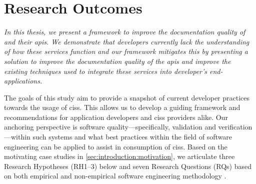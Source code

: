 \section{Research Outcomes}
\label{sec:introduction:hypohtesis}

\begin{framed}
\itshape
\noindent
In this thesis, we present a framework to improve the documentation quality of  and their \glspl{api}. We demonstrate that developers currently lack the understanding of how these services function and our framework mitigates this by presenting a solution to improve the documentation quality of the \glspl{api} and improve the existing techniques used to integrate these services into developer's end-applications.
\end{framed}

\upshape
\bigskip

The goals of this study aim to provide a snapshot of current developer practices towards the usage of \glspl{cis}. This allows us to develop a guiding framework and recommendations for application developers and \glspl{cis} providers alike. Our anchoring perspective is software quality---specifically, validation and verification---within such systems and what best practices within the field of software engineering can be applied to assist in consumption of \glspl{cis}.
 Based on the motivating case studies in \cref{sec:introduction:motivation}, we articulate three Research Hypotheses (RH1--3) below and seven Research Questions (RQs) based on  both empirical and non-empirical software engineering methodology \citep{Shull:2007vh,Simon:1996uw}.

\newcommand{\rh}[1]{\hyperref[rh#1]{RH#1}}

